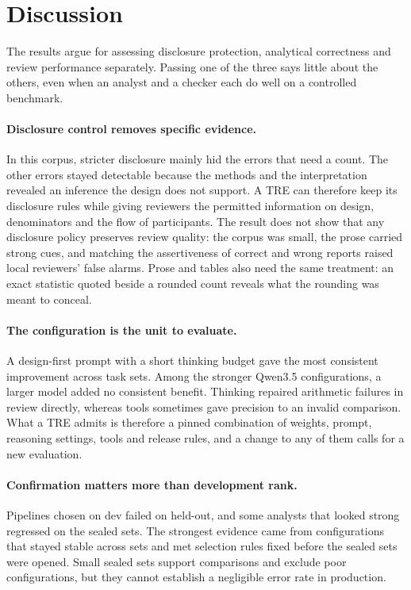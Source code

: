 \section{Discussion}
\label{sec:discussion}

The results argue for assessing disclosure protection, analytical correctness and review performance separately. Passing one of the three says little about the others, even when an analyst and a checker each do well on a controlled benchmark.

\paragraph{Disclosure control removes specific evidence.}
In this corpus, stricter disclosure mainly hid the errors that need a count. The other errors stayed detectable because the methods and the interpretation revealed an inference the design does not support. A TRE can therefore keep its disclosure rules while giving reviewers the permitted information on design, denominators and the flow of participants. The result does not show that any disclosure policy preserves review quality: the corpus was small, the prose carried strong cues, and matching the assertiveness of correct and wrong reports raised local reviewers' false alarms. Prose and tables also need the same treatment: an exact statistic quoted beside a rounded count reveals what the rounding was meant to conceal.

\paragraph{The configuration is the unit to evaluate.}
A design-first prompt with a short thinking budget gave the most consistent improvement across task sets. Among the stronger Qwen3.5 configurations, a larger model added no consistent benefit. Thinking repaired arithmetic failures in review directly, whereas tools sometimes gave precision to an invalid comparison. What a TRE admits is therefore a pinned combination of weights, prompt, reasoning settings, tools and release rules, and a change to any of them calls for a new evaluation.

\paragraph{Confirmation matters more than development rank.}
Pipelines chosen on dev failed on held-out, and some analysts that looked strong regressed on the sealed sets. The strongest evidence came from configurations that stayed stable across sets and met selection rules fixed before the sealed sets were opened. Small sealed sets support comparisons and exclude poor configurations, but they cannot establish a negligible error rate in production.

